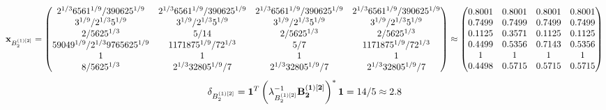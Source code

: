 \documentclass[10pt,a4paper]{article}
\begin{document}
	\[
		\bold{x}_{B_2^{(1)[2]}} = 
		\begin{pmatrix}
			{{2^ {1 / 3}}{6561^ {1 / 9}}} / {{390625^ {1 / 9}}} & {{2^ {1 / 3}}{6561^ {1 / 9}}} / {{390625^ {1 / 9}}} & {{2^ {1 / 3}}{6561^ {1 / 9}}} / {{390625^ {1 / 9}}} & {{2^ {1 / 3}}{6561^ {1 / 9}}} / {{390625^ {1 / 9}}} \\
			{{3^ {1 / 9}}} / {{2^ {1 / 3}}{5^ {1 / 9}}} & {{3^ {1 / 9}}} / {{2^ {1 / 3}}{5^ {1 / 9}}} & {{3^ {1 / 9}}} / {{2^ {1 / 3}}{5^ {1 / 9}}} & {{3^ {1 / 9}}} / {{2^ {1 / 3}}{5^ {1 / 9}}} \\
			{{2}} / {{5625^ {1 / 3}}} & {{5}} / {{14}} & {{2}} / {{5625^ {1 / 3}}} & {{2}} / {{5625^ {1 / 3}}} \\
			{{59049^ {1 / 9}}} / {{2^ {1 / 3}}{9765625^ {1 / 9}}} & {{1171875^ {1 / 9}}} / {{7}{2^ {1 / 3}}} & {{5}} / {{7}} & {{1171875^ {1 / 9}}} / {{7}{2^ {1 / 3}}} \\
			{1}{} & {1}{} & {1}{} & {1}{} \\
			{{8}} / {{5625^ {1 / 3}}} & {{2^ {1 / 3}}{32805^ {1 / 9}}} / {{7}} & {{2^ {1 / 3}}{32805^ {1 / 9}}} / {{7}} & {{2^ {1 / 3}}{32805^ {1 / 9}}} / {{7}} \\
		\end{pmatrix}
		\approx
		\begin{pmatrix}
			0.8001   & 0.8001   & 0.8001   & 0.8001   \\
			0.7499   & 0.7499   & 0.7499   & 0.7499   \\
			0.1125   & 0.3571   & 0.1125   & 0.1125   \\
			0.4499   & 0.5356   & 0.7143   & 0.5356   \\
			1        & 1        & 1        & 1        \\
			0.4498   & 0.5715   & 0.5715   & 0.5715   \\
		\end{pmatrix}
	\]
	\[
		\delta_{B_2^{(1)[2]}} = \bold{1}^T \left(\lambda_{B_2^{(1)[2]}}^{-1}\bold{B_2^{(1)[2]}}\right)^* \bold{1} = {{14}} / {{5}}\approx 2.8
	\]
\end{document}
